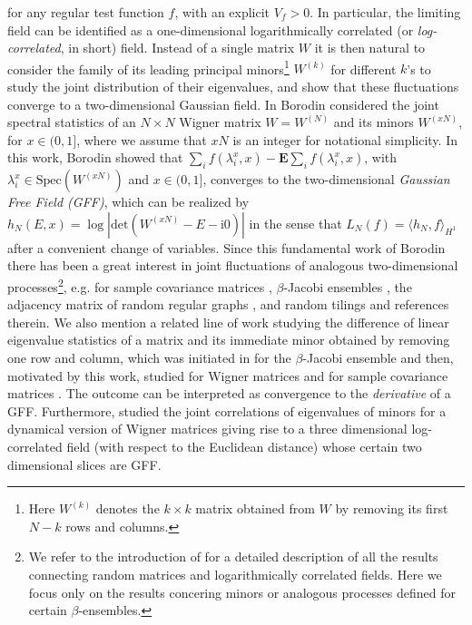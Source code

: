 \documentclass[10pt]{amsart}
\numberwithin{equation}{section}
\newcommand{\E}{\mathbf{E}}
\newcommand{\ii}{\mathrm{i}}
\begin{document}
for any regular test function $f$, with an explicit $V_f>0$. In particular, the limiting field can be identified as a one-dimensional logarithmically correlated (or \emph{log-correlated}, in short) field. Instead of a single matrix $W$ it is then natural to consider the family of its leading principal minors\footnote{Here $W^{(k)}$ denotes the $k\times k$ matrix obtained from $W$ by removing its first $N-k$ rows and columns.} $W^{(k)}$ for different $k$'s to study the joint distribution of their eigenvalues, and show that these fluctuations converge to a two-dimensional Gaussian field. In \cite{Bor} Borodin considered the joint spectral statistics of an $N\times N$ Wigner matrix $W=W^{(N)}$ and its minors $W^{(xN)}$, for $x\in (0,1]$, where we assume that $xN$ is an integer for notational simplicity. In this work, Borodin showed that $\sum_i f(\lambda_i^x,x)-\E \sum_i f(\lambda_i^x,x)$, with $\lambda_i^x\in\mathrm{Spec}(W^{(xN)})$ and $x\in (0,1]$, converges to  the two-dimensional \emph{Gaussian Free Field (GFF)}, which can be realized by $h_N(E, x) =\log|\mathrm{det}(W^{(xN)}-E-\ii 0)|$ in the sense that $L_N(f)=\langle h_N, f\rangle_{H^1}$ after a convenient change of variables. Since this fundamental work of Borodin there has been a great interest in joint fluctuations of analogous two-dimensional processes\footnote{We refer to the introduction of \cite{bourgade2024fluctuations} for a detailed description of all the results connecting random matrices and logarithmically correlated fields. Here we focus only on the results concering minors or analogous processes defined for certain $\beta$-ensembles.}, e.g. for sample covariance matrices \cite{Dumitriu18}, $\beta$-Jacobi ensembles \cite{beta_corners15}, the adjacency matrix of random regular graphs \cite{Johnson14, Ganguly20}, and random tilings \cite{borot2026macroscopic} and references therein. We also mention a related line of work studying the difference of linear eigenvalue statistics of a matrix and its  immediate minor obtained by removing one row and column, which was initiated in \cite{beta_corners18} for the $\beta$-Jacobi ensemble and then, motivated by this work, studied for Wigner matrices \cite{Dominik18} and for sample covariance matrices \cite{SampleCov20}. The outcome can be interpreted as convergence to the \emph{derivative} of a GFF. Furthermore, \cite{BorII} studied the joint correlations of eigenvalues of minors for a dynamical version of Wigner matrices giving rise to a three dimensional log-correlated field (with respect to the Euclidean distance) whose certain two dimensional slices are GFF.
\end{document}
